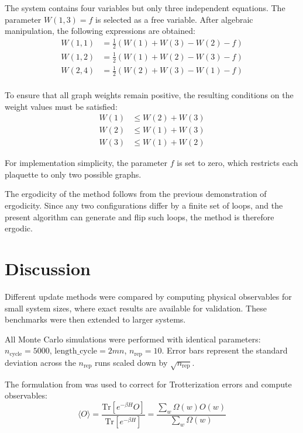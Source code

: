 \documentclass[a4paper]{article}
\begin{document}
The system contains four variables but only three independent equations. The parameter $W(1, 3) = f$ is selected as a free variable. After algebraic manipulation, the following expressions are obtained:
\begin{align*}
    W(1, 1) &= \frac{1}{2}\left(W(1) + W(3) - W(2) - f\right) \\
    W(1, 2) &= \frac{1}{2}\left(W(1) + W(2) - W(3) - f\right) \\
    W(2, 4) &= \frac{1}{2}\left(W(2) + W(3) - W(1) - f\right) \\
\end{align*}

To ensure that all graph weights remain positive, the resulting conditions on the weight values must be satisfied:
\begin{align*}
    W(1) &\leq W(2) + W(3) \\
    W(2) &\leq W(1) + W(3) \\
    W(3) &\leq W(1) + W(2)
\end{align*}

For implementation simplicity, the parameter $f$ is set to zero, which restricts each plaquette to only two possible graphs.

The ergodicity of the method follows from the previous demonstration of ergodicity. Since any two configurations differ by a finite set of loops, and the present algorithm can generate and flip such loops, the method is therefore ergodic.

\newpage
\section{Discussion}

Different update methods were compared by computing physical observables for small system sizes, where exact results are available for validation. These benchmarks were then extended to larger systems.

All Monte Carlo simulations were performed with identical parameters: $n_\text{cycle}=5000$, $\text{length\_cycle}=2mn$, $n_\text{rep}=10$. Error bars represent the standard deviation across the $n_\text{rep}$ runs scaled down by $\sqrt{n_\text{rep}}$.

The formulation from \textcite{Assaad2008} was used to correct for Trotterization errors and compute observables:
\begin{equation}
    \langle O \rangle = \frac{\text{Tr} \left[ e^{-\beta H} O \right]}{\text{Tr} \left[ e^{-\beta H} \right]} = \frac{\sum_{w} \Omega(w) O(w)}{\sum_{w} \Omega(w)}
\end{equation}
\end{document}
